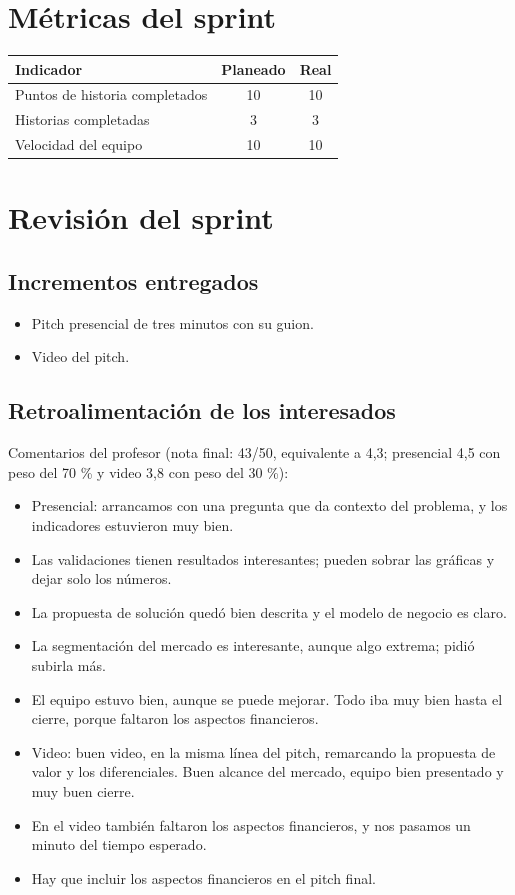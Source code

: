\documentclass[11pt,a4paper]{article}
\begin{document}
\section{Métricas del sprint}

\begin{tabularx}{\textwidth}{X c c}
  \toprule
  \textbf{Indicador} & \textbf{Planeado} & \textbf{Real} \\
  \midrule
  Puntos de historia completados & 10 & 10 \\
  Historias completadas          & 3 & 3 \\
  Velocidad del equipo           & 10 & 10 \\
  \bottomrule
\end{tabularx}

\section{Revisión del sprint}

\subsection{Incrementos entregados}
\begin{itemize}[leftmargin=1.5em]
  \item {Pitch presencial de tres minutos con su guion.}
  \item {Video del pitch.}
\end{itemize}

\subsection{Retroalimentación de los interesados}
{Comentarios del profesor (nota final: 43/50, equivalente a 4,3; presencial 4,5 con peso del 70 \% y video 3,8 con peso del 30 \%):}
\begin{itemize}[leftmargin=1.5em]
  \item {Presencial: arrancamos con una pregunta que da contexto del problema, y los indicadores estuvieron muy bien.}
  \item {Las validaciones tienen resultados interesantes; pueden sobrar las gráficas y dejar solo los números.}
  \item {La propuesta de solución quedó bien descrita y el modelo de negocio es claro.}
  \item {La segmentación del mercado es interesante, aunque algo extrema; pidió subirla más.}
  \item {El equipo estuvo bien, aunque se puede mejorar. Todo iba muy bien hasta el cierre, porque faltaron los aspectos financieros.}
  \item {Video: buen video, en la misma línea del pitch, remarcando la propuesta de valor y los diferenciales. Buen alcance del mercado, equipo bien presentado y muy buen cierre.}
  \item {En el video también faltaron los aspectos financieros, y nos pasamos un minuto del tiempo esperado.}
  \item {Hay que incluir los aspectos financieros en el pitch final.}
\end{itemize}
\end{document}
